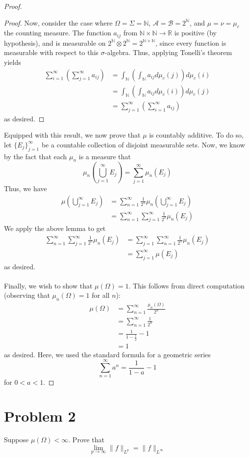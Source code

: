\documentclass[fontsize=11pt]{scrartcl} %
\numberwithin{equation}{section} %
\numberwithin{figure}{section} %
\numberwithin{table}{section} %
\newcommand{\R}{\mathbb{R}}
\newcommand{\N}{\mathbb{N}}
\begin{document}
\begin{proof}
\begin{proof}
        Now, consider the case where $\Omega = \Sigma = \N$, $\mathscr{A} =
        \mathscr{B} = 2^{\N}$, and $\mu = \nu = \mu_c$ the counting measure.
        The function $a_{ij}$ from $\N\times\N\to\R$ is positive (by
        hypothesis), and is measurable on $2^{\N}\otimes 2^{\N} =
        2^{\N\times\N}$, since every function is measurable with respect to this
        $\sigma$-algebra. Thus, applying Tonelli's theorem yields
        \[
            \begin{aligned}
                \sum_{i=1}^{\infty}\left(\sum_{j=1}^{\infty}a_{ij}\right) &=
                \int_{\N}\left(\int_{\N}a_{ij}d\mu_c(j)\right)d\mu_c(i)\\
                &= \int_{\N}\left(\int_{\N}a_{ij}d\mu_c(i)\right)d\mu_c(j)\\
                &=\sum_{j=1}^{\infty}\left(\sum_{i=1}^{\infty}a_{ij}\right)
            \end{aligned}
        \]
        as desired.
    \end{proof}
    Equipped with this result, we now prove that $\mu$ is countably additive.
    To do so, let $\{E_j\}_{j=1}^{\infty}$ be a countable collection of disjoint
    measurable sets. Now, we know by the fact that each $\mu_n$ is a measure
    that
    \[
        \mu_n\left(\bigcup_{j=1}^{\infty}E_j\right) = \sum_{j=1}^{\infty}\mu_n(E_j)
    \]
    Thus, we have
    \[
        \begin{aligned}
            \mu\left(\bigcup_{j=1}^{\infty}E_j\right) &=
            \sum_{n=1}^{\infty}\frac{1}{2^n}\mu_n\left(\bigcup_{j=1}^{\infty}E_j\right)\\
            &=\sum_{n=1}^{\infty}\sum_{j=1}^{\infty}\frac{1}{2^n}\mu_n(E_j)
        \end{aligned}
    \]
    We apply the above lemma to get
    \[
        \begin{aligned}
            \sum_{n=1}^{\infty}\sum_{j=1}^{\infty}\frac{1}{2^n}\mu_n(E_j)
            &= \sum_{j=1}^{\infty}\sum_{n=1}^{\infty}\frac{1}{2^n}\mu_n(E_j)\\
            &=\sum_{j=1}^{\infty}\mu(E_j)
        \end{aligned}
    \]
    as desired.
    \\
    \\
    Finally, we wish to show that $\mu(\Omega) = 1$. This follows from direct
    computation (observing that $\mu_n(\Omega)=1$ for all $n$):
    \[
        \begin{aligned}
            \mu(\Omega) &= \sum_{n=1}^{\infty}\frac{\mu_n(\Omega)}{2^n}\\
            &= \sum_{n=1}^{\infty}\frac{1}{2^n}\\
            &= \frac{1}{1-\frac{1}{2}}-1\\
            &=1
        \end{aligned}
    \]
    as desired. Here, we used the standard formula for a geometric series
    \[
        \sum_{n=1}^{\infty}a^n = \frac{1}{1-a}-1
    \]
    for $0<a<1$.
\end{proof}

\newpage

\section*{Problem 2}
Suppose $\mu(\Omega)<\infty$. Prove that
\[
    \lim_{p\to\infty} \|f\|_{L^p} = \|f\|_{L^{\infty}}
\]
\end{document}
